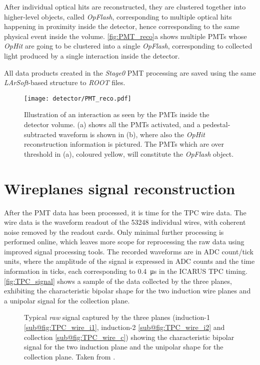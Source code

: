 After individual optical hits are reconstructed, they are clustered together into higher-level objects, called \emph{OpFlash}, corresponding to multiple optical hits happening in proximity inside the detector, hence corresponding to the same physical event inside the volume. \autoref{fig:PMT_reco}a shows multiple PMTs whose \emph{OpHit} are going to be clustered into a single \emph{OpFlash}, corresponding to collected light produced by a single interaction inside the detector. 

All data products created in the \emph{Stage0} PMT processing are saved using the same \emph{LArSoft}-based structure to \emph{ROOT} \cite{rene_brun_2019_3895860} files. 

\begin{figure}
    \centering
    \texttt{[image: detector/PMT\_reco.pdf]}
    \caption[PMT reconstructed \emph{OpHits}]{Illustration of an interaction as seen by the PMTs inside the detector volume. (a) shows all the PMTs activated, and a pedestal-subtracted waveform is shown in (b), where also the \emph{OpHit} reconstruction information is pictured. The PMTs which are over threshold in (a), coloured yellow, will constitute the \emph{OpFlash} object.}
    \label{fig:PMT_reco}
\end{figure}

\section{Wireplanes signal reconstruction}

After the PMT data has been processed, it is time for the TPC wire data. The wire data is the waveform readout of the \num{53248} individual wires, with coherent noise removed by the readout cards. Only minimal further processing is performed online, which leaves more scope for reprocessing the raw data using improved signal processing tools. The recorded waveforms are in ADC count/tick units, where the amplitude of the signal is expressed in ADC counts and the time information in ticks, each corresponding to \SI{0.4}{\us} in the ICARUS TPC timing. \autoref{fig:TPC_signal} shows a sample of the data collected by the three planes, exhibiting the characteristic bipolar shape for the two induction wire planes and a unipolar signal for the collection plane. 

\begin{figure}
    \centering
    \caption[TPC plane signal]{Typical \emph{raw} signal captured by the three planes (induction-1 \ref{sub@fig:TPC_wire_i1}, induction-2 \ref{sub@fig:TPC_wire_i2} and collection \ref{sub@fig:TPC_wire_c}) showing the characteristic bipolar signal for the two induction plane and the unipolar shape for the collection plane. Taken from \cite{ICARUS:2024hmk}. }
    \label{fig:TPC_signal}
\end{figure}

